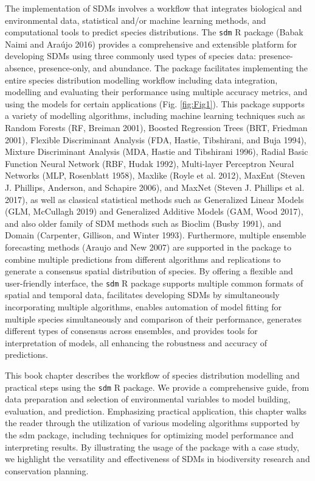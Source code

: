 \documentclass[
]{article}
\begin{document}
The implementation of SDMs involves a workflow that integrates
biological and environmental data, statistical and/or machine learning
methods, and computational tools to predict species distributions. The
\texttt{sdm} R package (Babak Naimi and Araújo 2016) provides a
comprehensive and extensible platform for developing SDMs using three
commonly used types of species data: presence-absence, presence-only,
and abundance. The package facilitates implementing the entire species
distribution modelling workflow including data integration, modelling
and evaluating their performance using multiple accuracy metrics, and
using the models for certain applications (Fig. \ref{fig:Fig1}). This
package supports a variety of modelling algorithms, including machine
learning techniques such as Random Forests (RF, Breiman 2001), Boosted
Regression Trees (BRT, Friedman 2001), Flexible Discriminant Analysis
(FDA, Hastie, Tibshirani, and Buja 1994), Mixture Discriminant Analysis
(MDA, Hastie and Tibshirani 1996), Radial Basic Function Neural Network
(RBF, Hudak 1992), Multi-layer Perceptron Neural Networks (MLP,
Rosenblatt 1958), Maxlike (Royle et al. 2012), MaxEnt (Steven J.
Phillips, Anderson, and Schapire 2006), and MaxNet (Steven J. Phillips
et al. 2017), as well as classical statistical methods such as
Generalized Linear Models (GLM, McCullagh 2019) and Generalized Additive
Models (GAM, Wood 2017), and also older family of SDM methods such as
Bioclim (Busby 1991), and Domain (Carpenter, Gillison, and Winter 1993).
Furthermore, multiple ensemble forecasting methods (Araujo and New 2007)
are supported in the package to combine multiple predictions from
different algorithms and replications to generate a consensus spatial
distribution of species. By offering a flexible and user-friendly
interface, the \texttt{sdm} R package supports multiple common formats
of spatial and temporal data, facilitates developing SDMs by
simultaneously incorporating multiple algorithms, enables automation of
model fitting for multiple species simultaneously and comparison of
their performance, generates different types of consensus across
ensembles, and provides tools for interpretation of models, all
enhancing the robustness and accuracy of predictions.

This book chapter describes the workflow of species distribution
modelling and practical steps using the \texttt{sdm} R package. We
provide a comprehensive guide, from data preparation and selection of
environmental variables to model building, evaluation, and prediction.
Emphasizing practical application, this chapter walks the reader through
the utilization of various modeling algorithms supported by the sdm
package, including techniques for optimizing model performance and
interpreting results. By illustrating the usage of the package with a
case study, we highlight the versatility and effectiveness of SDMs in
biodiversity research and conservation planning.
\end{document}
